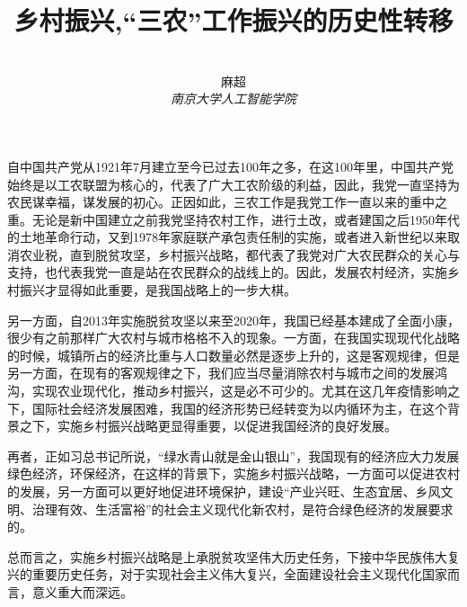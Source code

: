\documentclass[12pt,a4paper]{ctexart}
\title{\textbf{乡村振兴,“三农”工作振兴的历史性转移}}
\author{
\\
\Large{麻超 \quad 201300066}
\\[6pt]
{ \large \textit{南京大学人工智能学院}}\\[2pt]
}
\date{}
\begin{document}
\maketitle
\setcounter{page}{1}

自中国共产党从1921年7月建立至今已过去100年之多，在这100年里，中国共产党始终是以工农联盟为核心的，代表了广大工农阶级的利益，因此，我党一直坚持为农民谋幸福，谋发展的初心。正因如此，三农工作是我党工作一直以来的重中之重。无论是新中国建立之前我党坚持农村工作，进行土改，或者建国之后1950年代的土地革命行动，又到1978年家庭联产承包责任制的实施，或者进入新世纪以来取消农业税，直到脱贫攻坚，乡村振兴战略，都代表了我党对广大农民群众的关心与支持，也代表我党一直是站在农民群众的战线上的。因此，发展农村经济，实施乡村振兴才显得如此重要，是我国战略上的一步大棋。

另一方面，自2013年实施脱贫攻坚以来至2020年，我国已经基本建成了全面小康，很少有之前那样广大农村与城市格格不入的现象。一方面，在我国实现现代化战略的时候，城镇所占的经济比重与人口数量必然是逐步上升的，这是客观规律，但是另一方面，在现有的客观规律之下，我们应当尽量消除农村与城市之间的发展鸿沟，实现农业现代化，推动乡村振兴，这是必不可少的。尤其在这几年疫情影响之下，国际社会经济发展困难，我国的经济形势已经转变为以内循环为主，在这个背景之下，实施乡村振兴战略更显得重要，以促进我国经济的良好发展。

再者，正如习总书记所说，“绿水青山就是金山银山”，我国现有的经济应大力发展绿色经济，环保经济，在这样的背景下，实施乡村振兴战略，一方面可以促进农村的发展，另一方面可以更好地促进环境保护，建设“产业兴旺、生态宜居、乡风文明、治理有效、生活富裕”的社会主义现代化新农村，是符合绿色经济的发展要求的。

总而言之，实施乡村振兴战略是上承脱贫攻坚伟大历史任务，下接中华民族伟大复兴的重要历史任务，对于实现社会主义伟大复兴，全面建设社会主义现代化国家而言，意义重大而深远。
\end{document}
